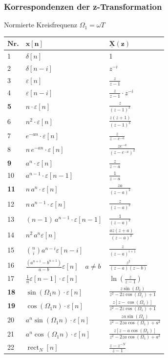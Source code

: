 \subsubsection{Korrespondenzen der z-Transformation}
Normierte Kreisfrequenz $\Omega_1 = \omega T$\\
\renewcommand{\arraystretch}{1.7}
\begin{tabularx}{\columnwidth}{|l|X|X|}
	\hline $\mathbf{N r}$. & $\mathbf{x}[\mathbf{n}]$ & $\mathbf{\underline{X}}(\mathbf{z})$ \\
	\hline 1 & $\delta[n]$ & 1 \\
	\hline 2 & $\delta[n-i]$ & $z^{-i}$ \\
	\hline 3 & $\varepsilon[n]$ & $\frac{z}{z-1}$ \\
	\hline 4 & $\varepsilon[n-i]$ & $\frac{z}{z-1} \cdot z^{-i}$ \\
	\hline \textbf{5} & $n \cdot \varepsilon[n]$ & $\frac{z}{(z-1)^{2}}$ \\
	\hline 6 &  $n^2 \cdot \varepsilon[n]$ & $\frac{z(z+1)}{(z-1)^3}$  \\
\hline 7 & $e^{-a n} \cdot \varepsilon[n]$ & $\frac{z}{z-e^{-a}}$ \\
\hline 8 & $n \, e^{-a n} \cdot \varepsilon[n]$ & $\frac{z e^{-a}}{\left(z-e^{-a}\right)^{2}}$ \\
\hline \textbf{9} & $a^{n} \cdot \varepsilon[n]$ & $\frac{z}{z-a}$ \\
\hline 10 & $a^{n-1} \cdot \varepsilon[n-1]$ & $\frac{1}{z-a}$ \\
\hline \textbf{11} & $n\,a^{n} \cdot \varepsilon[n]$ & $\frac{z a}{(z-a)^{2}}$ \\
\hline 12 & $n \, a^{n-1} \cdot \varepsilon[n]$ & $\frac{z}{(z-a)^{2}}$ \\
\hline 13 & $(n-1) \, a^{n-1} \cdot \varepsilon[n-1]$ & $\frac{1}{(z-a)^{2}}$ \\
\hline 14 & $n^{2} \, a^{n} \varepsilon[n]$ & $\frac{a z(z+a)}{(z-a)^{3}}$ \\
\hline 15 & $\binom{n}{i} a^{n-i} \varepsilon[n-i]$ & $\frac{z}{(z-a)^{i+1}}$ \\
\hline 16 & $\frac{\left(a^{n+1}-b^{n+1}\right)}{a-b} \varepsilon[n] \quad a \neq b$ & $\frac{z^{2}}{(z-a)(z-b)}$ \\
\hline 17 & $\frac{1}{n} \varepsilon[n-1] \cdot \varepsilon[n]$ & $\ln \left(\frac{z}{z-1}\right)$ \\
\hline \textbf{18} & $\sin (\Omega_1 n ) \cdot \varepsilon[n]$ & $\frac{z \sin (\Omega_1)}{z^{2}-2 z \cos (\Omega_1)+1}$ \\
\hline \textbf{19} & $\cos (\Omega_1 n ) \cdot \varepsilon[n]$ & $\frac{z[z-\cos (\Omega_1)]}{z^{2}-2 z \cos (\Omega_1)+1}$ \\
\hline 20 & $a^{n} \sin (\Omega_1 n) \cdot \varepsilon[n]$ & $\frac{z a \sin (\Omega_1)}{z^{2}-2 z a \cos (\Omega_1)+a^{2}}$ \\
\hline 21 & $a^{n} \cos (\Omega_1 n) \cdot \varepsilon[n]$ & $\frac{z[z-a \cos (\Omega_1)]}{z^{2}-2 z a \cos (\Omega_1)+a^{2}}$ \\
\hline 22 & $\operatorname{rect}_{N}[n]$ & $\frac{z-z^{-N}}{z-1}$ \\
\hline
\end{tabularx}
\clearpage

